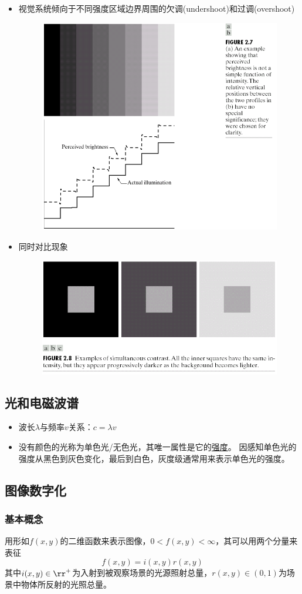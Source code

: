 \begin{itemize}
\begin{itemize}
	\item 视觉系统倾向于不同强度区域边界周围的欠调(undershoot)和过调(overshoot)
	\begin{figure}[H]
	\centering
	\includegraphics[width=0.5\linewidth]{fig/undershoot-overshoot.png}
	\end{figure}
	\item 同时对比现象
	\begin{figure}[H]
	\centering
	\includegraphics[width=0.5\linewidth]{fig/simultaneous-contrast.png}
	\end{figure}
\end{itemize}
\end{itemize}

\subsection{光和电磁波谱}
\begin{itemize}
\item 波长$\lambda$与频率$v$关系：$c=\lambda v$
\item 没有颜色的光称为单色光/无色光，其唯一属性是它的\underline{强度}。
因感知单色光的强度从黑色到灰色变化，最后到白色，灰度级通常用来表示单色光的强度。
\end{itemize}

\subsection{图像数字化}
\subsubsection{基本概念}
用形如$f(x,y)$的二维函数来表示图像，$0<f(x,y)<\infty$，其可以用两个分量来表征
\[f(x,y)=i(x,y)r(x,y)\]
其中$i(x,y)\in\rr^+$为入射到被观察场景的光源照射总量，$r(x,y)\in(0,1)$为场景中物体所反射的光照总量。

